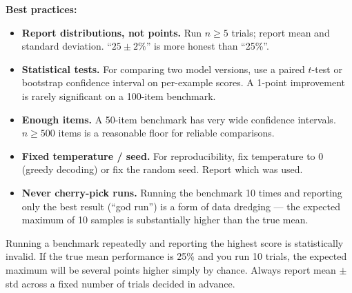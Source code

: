 \textbf{Best practices:}
\begin{itemize}
  \item \textbf{Report distributions, not points.} Run $n \geq 5$ trials; report mean
    and standard deviation. ``$25 \pm 2\%$'' is more honest than ``25\%''.
  \item \textbf{Statistical tests.} For comparing two model versions, use a paired
    $t$-test or bootstrap confidence interval on per-example scores. A 1-point
    improvement is rarely significant on a 100-item benchmark.
  \item \textbf{Enough items.} A 50-item benchmark has very wide confidence intervals.
    $n \geq 500$ items is a reasonable floor for reliable comparisons.
  \item \textbf{Fixed temperature / seed.} For reproducibility, fix temperature to 0
    (greedy decoding) or fix the random seed. Report which was used.
  \item \textbf{Never cherry-pick runs.} Running the benchmark 10 times and reporting
    only the best result (``god run'') is a form of data dredging --- the expected
    maximum of 10 samples is substantially higher than the true mean.
\end{itemize}

\begin{warnbox}[title=The ``god run'' anti-pattern]
  Running a benchmark repeatedly and reporting the highest score is statistically
  invalid. If the true mean performance is 25\% and you run 10 trials, the expected
  maximum will be several points higher simply by chance. Always report mean $\pm$ std
  across a fixed number of trials decided in advance.
\end{warnbox}

